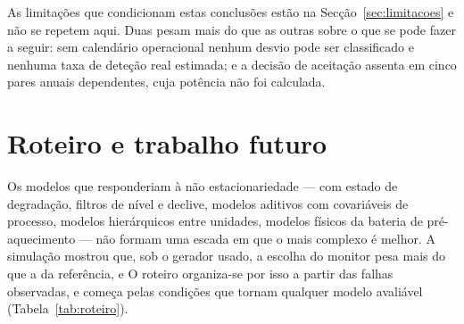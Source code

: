 As limitações que condicionam estas conclusões estão na
Secção~\ref{sec:limitacoes} e não se repetem aqui. Duas pesam mais do que as
outras sobre o que se pode fazer a seguir: sem calendário operacional nenhum
desvio pode ser classificado e nenhuma taxa de deteção real estimada; e a
decisão de aceitação assenta em cinco pares anuais dependentes, cuja
potência não foi calculada.

\section{Roteiro e trabalho futuro}
\label{sec:roteiro-modelos}
\label{sec:trabalho-futuro}

Os modelos que responderiam à não estacionariedade --- com estado de
degradação, filtros de nível e declive, modelos aditivos com covariáveis de
processo, modelos hierárquicos entre unidades, modelos físicos da bateria de
pré-aquecimento --- não formam uma escada em que o mais complexo é melhor. A
simulação mostrou que, sob o gerador usado, a escolha do monitor pesa mais do
que a da referência, e  O roteiro organiza-se por isso a partir das falhas observadas, e começa
pelas condições que tornam qualquer modelo avaliável
(Tabela~\ref{tab:roteiro}).

